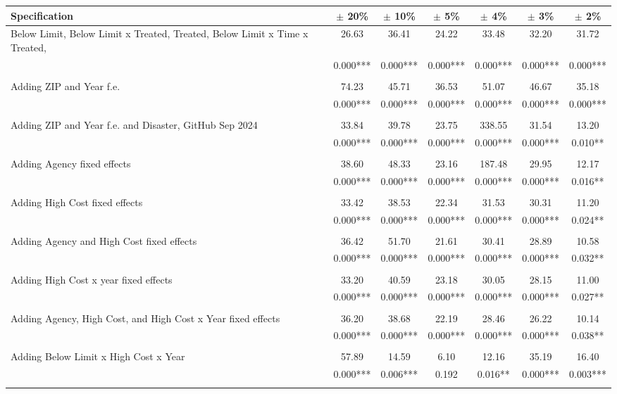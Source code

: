 \begin{tabular}{p{5cm}cccccc}
  \hline
Specification & $\pm$ 20\% & $\pm$ 10\% & $\pm$  5\% & $\pm$  4\% & $\pm$  3\% & $\pm$  2\% \\ 
  \hline
Below Limit, Below
Limit x Treated,
Treated, Below Limit
x Time x Treated, & 26.63 & 36.41 & 24.22 & 33.48 & 32.20 & 31.72 \\ 
   & 0.000*** & 0.000*** & 0.000*** & 0.000*** & 0.000*** & 0.000*** \\ 
   &  &  &  &  &  &  \\ 
  Adding ZIP and Year
f.e. & 74.23 & 45.71 & 36.53 & 51.07 & 46.67 & 35.18 \\ 
   & 0.000*** & 0.000*** & 0.000*** & 0.000*** & 0.000*** & 0.000*** \\ 
   &  &  &  &  &  &  \\ 
  Adding ZIP and Year
f.e. and Disaster,
GitHub Sep 2024 & 33.84 & 39.78 & 23.75 & 338.55 & 31.54 & 13.20 \\ 
   & 0.000*** & 0.000*** & 0.000*** & 0.000*** & 0.000*** & 0.010** \\ 
   &  &  &  &  &  &  \\ 
  Adding Agency fixed
effects & 38.60 & 48.33 & 23.16 & 187.48 & 29.95 & 12.17 \\ 
   & 0.000*** & 0.000*** & 0.000*** & 0.000*** & 0.000*** & 0.016** \\ 
   &  &  &  &  &  &  \\ 
  Adding High Cost
fixed effects & 33.42 & 38.53 & 22.34 & 31.53 & 30.31 & 11.20 \\ 
   & 0.000*** & 0.000*** & 0.000*** & 0.000*** & 0.000*** & 0.024** \\ 
   &  &  &  &  &  &  \\ 
  Adding Agency and
High Cost fixed
effects & 36.42 & 51.70 & 21.61 & 30.41 & 28.89 & 10.58 \\ 
   & 0.000*** & 0.000*** & 0.000*** & 0.000*** & 0.000*** & 0.032** \\ 
   &  &  &  &  &  &  \\ 
  Adding High Cost x
year fixed effects & 33.20 & 40.59 & 23.18 & 30.05 & 28.15 & 11.00 \\ 
   & 0.000*** & 0.000*** & 0.000*** & 0.000*** & 0.000*** & 0.027** \\ 
   &  &  &  &  &  &  \\ 
  Adding Agency, High
Cost, and High Cost
x Year fixed effects & 36.20 & 38.68 & 22.19 & 28.46 & 26.22 & 10.14 \\ 
   & 0.000*** & 0.000*** & 0.000*** & 0.000*** & 0.000*** & 0.038** \\ 
   &  &  &  &  &  &  \\ 
  Adding Below Limit x
High Cost x Year & 57.89 & 14.59 & 6.10 & 12.16 & 35.19 & 16.40 \\ 
   & 0.000*** & 0.006*** & 0.192 & 0.016** & 0.000*** & 0.003*** \\ 
   &  &  &  &  &  &  \\ 
   \hline
\end{tabular}

